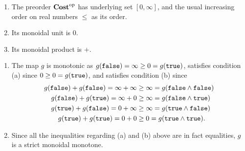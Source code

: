\documentclass[7Sketches]{subfiles}
\begin{document}
{
  \begin{enumerate}
    \item The preorder $\mathbf{Cost}^{\textnormal{op}}$ has underlying set $[0,\infty]$, and the usual
    increasing order on real numbers $\le$ as its order.
    \item Its monoidal unit is $0$.
    \item Its monoidal product is $+$.
\end{enumerate}
}

{
\begin{enumerate}
	\item The map $g$ is monotonic as $g(\mathtt{false}) = \infty \geq 0 =
	g(\mathtt{true})$, satisfies condition (a) since $0 \geq 0 = g(\mathtt{true})$, and
	satisfies condition (b) since 
	\begin{align*}
	g(\mathtt{false}) + g(\mathtt{false}) = \infty +\infty	&\geq \infty = g(\mathtt{false} \wedge
	\mathtt{false}) \\
	g(\mathtt{false}) + g(\mathtt{true}) = \infty+0 &\geq \infty = g(\mathtt{false} \wedge \mathtt{true}) \\
	g(\mathtt{true}) + g(\mathtt{false}) = 0 +\infty &\geq \infty = g(\mathtt{true} \wedge \mathtt{false})
	\\
	g(\mathtt{true}) +g(\mathtt{true}) = 0+0 &\geq 0 = g(\mathtt{true}\wedge \mathtt{true}).
	\end{align*}
	\item Since all the inequalities regarding (a) and (b) above are in fact
	equalities, $g$ is a strict monoidal monotone.
\end{enumerate}
}
\end{document}
